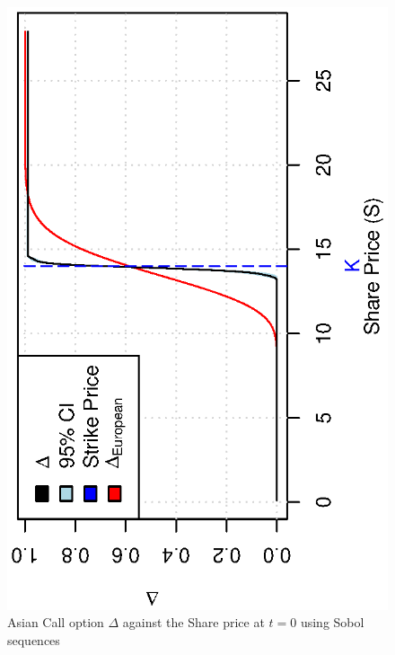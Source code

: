 \documentclass[12pt,a4paper]{article}
\begin{document}
\begin{figure}[!ht]
  \centering
  \includegraphics[scale=0.85,angle=-90]{./images/sobol/delta_share.eps}
  \caption{Asian Call option $\Delta$ against the Share price at $t=0$
  using Sobol sequences}
  \label{fig:delta-share-sobol}
\end{figure}
\end{document}
